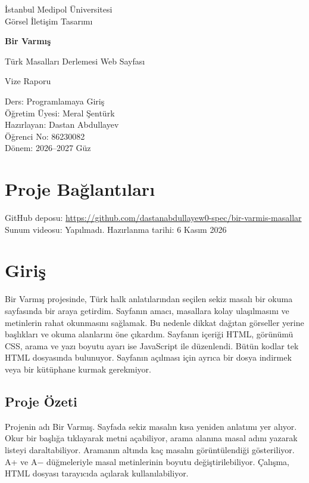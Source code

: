 \documentclass[11pt,a4paper]{article}
\begin{document}
\begin{titlepage}
\centering
{\large İstanbul Medipol Üniversitesi\\Görsel İletişim Tasarımı\par}
\vspace{22mm}
{\Huge\bfseries Bir Varmış\par}
\vspace{5mm}
{\Large Türk Masalları Derlemesi Web Sayfası\par}
\vspace{5mm}
{\Large Vize Raporu\par}
\vspace{9mm}
{\color{vurgu}\bfseries \par}
\vspace{15mm}
Ders: Programlamaya Giriş\\
Öğretim Üyesi: Meral Şentürk\\
Hazırlayan: Dastan Abdullayev\\
Öğrenci No: 86230082\\
Dönem: 2026–2027 Güz
\vspace{12mm}
\section*{Proje Bağlantıları}
GitHub deposu: \url{https://github.com/dastanabdullayew0-spec/bir-varmis-masallar}\\
Sunum videosu: Yapılmadı.
\vfill
Hazırlanma tarihi: 6 Kasım 2026\\

\end{titlepage}
\tableofcontents
\newpage

\section{Giriş}
Bir Varmış projesinde, Türk halk anlatılarından seçilen sekiz masalı bir okuma sayfasında bir araya getirdim. Sayfanın amacı, masallara kolay ulaşılmasını ve metinlerin rahat okunmasını sağlamak. Bu nedenle dikkat dağıtan görseller yerine başlıkları ve okuma alanlarını öne çıkardım. Sayfanın içeriği HTML, görünümü CSS, arama ve yazı boyutu ayarı ise JavaScript ile düzenlendi. Bütün kodlar tek HTML dosyasında bulunuyor. Sayfanın açılması için ayrıca bir dosya indirmek veya bir kütüphane kurmak gerekmiyor.

\subsection{Proje Özeti}
Projenin adı Bir Varmış. Sayfada sekiz masalın kısa yeniden anlatımı yer alıyor. Okur bir başlığa tıklayarak metni açabiliyor, arama alanına masal adını yazarak listeyi daraltabiliyor. Aramanın altında kaç masalın görüntülendiği gösteriliyor. A+ ve A− düğmeleriyle masal metinlerinin boyutu değiştirilebiliyor. Çalışma, HTML dosyası tarayıcıda açılarak kullanılabiliyor.
\end{document}
